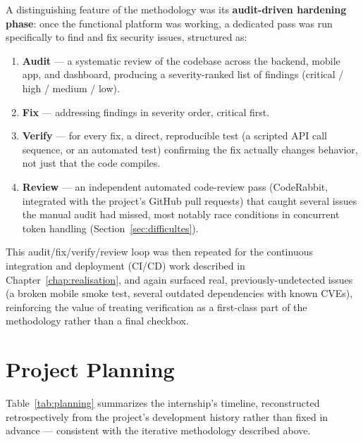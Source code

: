 A distinguishing feature of the methodology was its \textbf{audit-driven hardening phase}: once the functional platform was working, a dedicated pass was run specifically to find and fix security issues, structured as:

\begin{enumerate}[leftmargin=*]
  \item \textbf{Audit} --- a systematic review of the codebase across the backend, mobile app, and dashboard, producing a severity-ranked list of findings (critical / high / medium / low).
  \item \textbf{Fix} --- addressing findings in severity order, critical first.
  \item \textbf{Verify} --- for every fix, a direct, reproducible test (a scripted API call sequence, or an automated test) confirming the fix actually changes behavior, not just that the code compiles.
  \item \textbf{Review} --- an independent automated code-review pass (CodeRabbit, integrated with the project's GitHub pull requests) that caught several issues the manual audit had missed, most notably race conditions in concurrent token handling (Section~\ref{sec:difficultes}).
\end{enumerate}

This audit/fix/verify/review loop was then repeated for the continuous integration and deployment (CI/CD) work described in Chapter~\ref{chap:realisation}, and again surfaced real, previously-undetected issues (a broken mobile smoke test, several outdated dependencies with known CVEs), reinforcing the value of treating verification as a first-class part of the methodology rather than a final checkbox.

\section{Project Planning}

Table~\ref{tab:planning} summarizes the internship's timeline, reconstructed retrospectively from the project's development history rather than fixed in advance --- consistent with the iterative methodology described above.

